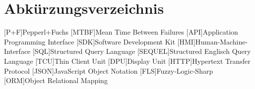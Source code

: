 
\chapter*{Abkürzungsverzeichnis}
\begin{acronym}[slmtA]
    [P+F]{Pepperl+Fuchs}
    [MTBF]{Mean Time Between Failures}
    [API]{Application Programming Interface}
    [SDK]{Software Development Kit}
    [HMI]{Human-Machine-Interface}
    [SQL]{Structured Query Language}
    [SEQUEL]{Structured Englisch Query Language}
    [TCU]{Thin Client Unit}
    [DPU]{Display Unit}
    [HTTP]{Hypertext Transfer Protocol}
    [JSON]{JavaScript Object Notation}
    [FLS]{Fuzzy-Logic-Sharp}
    [ORM]{Object Relational Mapping}
\end{acronym}
